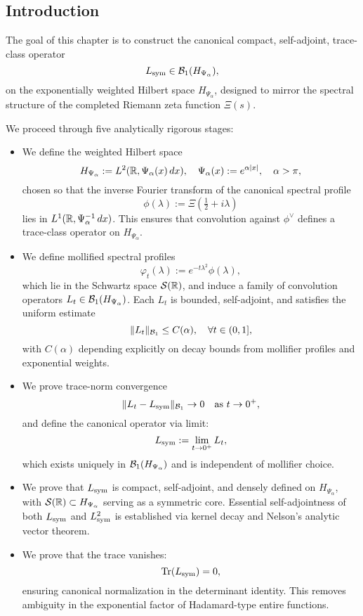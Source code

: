 \subsection*{Introduction}

The goal of this chapter is to construct the canonical compact, self-adjoint, trace-class operator
\[
L_{\mathrm{sym}} \in \mathcal{B}_1(H_{\Psi_\alpha}),
\]
on the exponentially weighted Hilbert space \( H_{\Psi_\alpha} \), designed to mirror the spectral structure of the completed Riemann zeta function \( \Xi(s) \).

We proceed through five analytically rigorous stages:

\begin{itemize}
    \item We define the weighted Hilbert space
    \[
    H_{\Psi_\alpha} := L^2(\mathbb{R}, \Psi_\alpha(x)\, dx), \quad \Psi_\alpha(x) := e^{\alpha |x|}, \quad \alpha > \pi,
    \]
    chosen so that the inverse Fourier transform of the canonical spectral profile
    \[
    \phi(\lambda) := \Xi\left(\tfrac{1}{2} + i\lambda\right)
    \]
    lies in \( L^1(\mathbb{R}, \Psi_\alpha^{-1}\, dx) \). This ensures that convolution against \( \phi^\vee \) defines a trace-class operator on \( H_{\Psi_\alpha} \).

    \item We define mollified spectral profiles
    \[
    \varphi_t(\lambda) := e^{-t\lambda^2} \phi(\lambda),
    \]
    which lie in the Schwartz space \( \mathcal{S}(\mathbb{R}) \), and induce a family of convolution operators \( L_t \in \mathcal{B}_1(H_{\Psi_\alpha}) \). Each \( L_t \) is bounded, self-adjoint, and satisfies the uniform estimate
    \[
    \| L_t \|_{\mathcal{B}_1} \le C(\alpha), \quad \forall t \in (0,1],
    \]
    with \( C(\alpha) \) depending explicitly on decay bounds from mollifier profiles and exponential weights.

    \item We prove trace-norm convergence
    \[
    \| L_t - L_{\mathrm{sym}} \|_{\mathcal{B}_1} \to 0 \quad \text{as } t \to 0^+,
    \]
    and define the canonical operator via limit:
    \[
    L_{\mathrm{sym}} := \lim_{t \to 0^+} L_t,
    \]
    which exists uniquely in \( \mathcal{B}_1(H_{\Psi_\alpha}) \) and is independent of mollifier choice.

    \item We prove that \( L_{\mathrm{sym}} \) is compact, self-adjoint, and densely defined on \( H_{\Psi_\alpha} \), with \( \mathcal{S}(\mathbb{R}) \subset H_{\Psi_\alpha} \) serving as a symmetric core. Essential self-adjointness of both \( L_{\mathrm{sym}} \) and \( L_{\mathrm{sym}}^2 \) is established via kernel decay and Nelson’s analytic vector theorem.

    \item We prove that the trace vanishes:
    \[
    \operatorname{Tr}(L_{\mathrm{sym}}) = 0,
    \]
    ensuring canonical normalization in the determinant identity. This removes ambiguity in the exponential factor of Hadamard-type entire functions.
\end{itemize}

